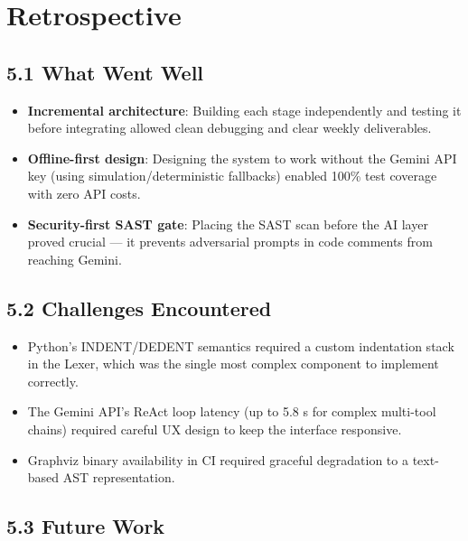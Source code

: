 \documentclass[a4paper,11pt]{article}
\begin{document}
\section{Retrospective}

\subsection{5.1 What Went Well}

\begin{itemize}[leftmargin=*]
    \item \textbf{Incremental architecture}: Building each stage independently and testing it before integrating allowed clean debugging and clear weekly deliverables.
    \item \textbf{Offline-first design}: Designing the system to work without the Gemini API key (using simulation/deterministic fallbacks) enabled 100\% test coverage with zero API costs.
    \item \textbf{Security-first SAST gate}: Placing the SAST scan before the AI layer proved crucial --- it prevents adversarial prompts in code comments from reaching Gemini.
\end{itemize}

\subsection{5.2 Challenges Encountered}

\begin{itemize}[leftmargin=*]
    \item Python's INDENT/DEDENT semantics required a custom indentation stack in the Lexer, which was the single most complex component to implement correctly.
    \item The Gemini API's ReAct loop latency (up to 5.8 s for complex multi-tool chains) required careful UX design to keep the interface responsive.
    \item Graphviz binary availability in CI required graceful degradation to a text-based AST representation.
\end{itemize}

\subsection{5.3 Future Work}
\end{document}

